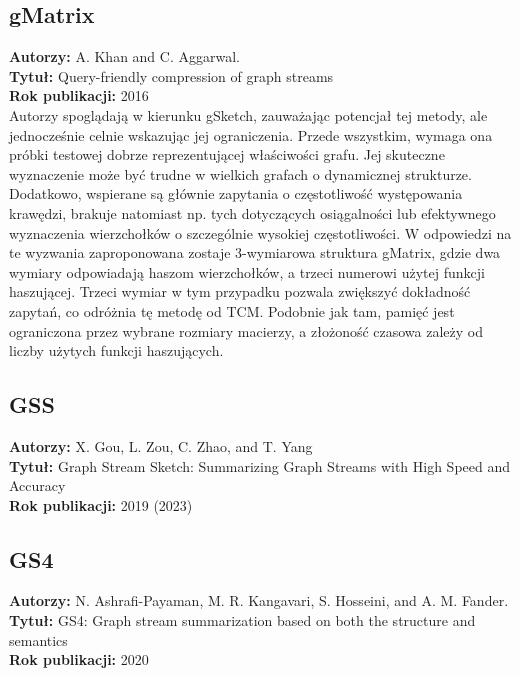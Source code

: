 \documentclass{article}
\begin{document}
        \subsection{gMatrix\cite{Khan_Aggarwal_2016}}
            \textbf{Autorzy: } A. Khan and C. Aggarwal.\\
            \textbf{Tytuł: } Query-friendly compression of graph streams\\
            \textbf{Rok publikacji: } 2016\\
            Autorzy spoglądają w kierunku gSketch, zauważając potencjał tej metody, ale jednocześnie celnie wskazując jej ograniczenia. Przede wszystkim, wymaga ona próbki testowej dobrze reprezentującej właściwości grafu. Jej skuteczne wyznaczenie może być trudne w wielkich grafach o dynamicznej strukturze. Dodatkowo, wspierane są głównie zapytania o częstotliwość występowania krawędzi, brakuje natomiast np. tych dotyczących osiągalności lub efektywnego wyznaczenia wierzchołków o szczególnie wysokiej częstotliwości. W odpowiedzi na te wyzwania zaproponowana zostaje 3-wymiarowa struktura gMatrix, gdzie dwa wymiary odpowiadają haszom wierzchołków, a trzeci numerowi użytej funkcji haszującej. Trzeci wymiar w tym przypadku pozwala zwiększyć dokładność zapytań, co odróżnia tę metodę od TCM. Podobnie jak tam, pamięć jest ograniczona przez wybrane rozmiary macierzy, a złożoność czasowa zależy od liczby użytych funkcji haszujących.  


        \subsection{GSS\cite{Gou_Zou_Zhao_Yang_2019, Gou_Zou_Zhao_Yang_2023}}
            \textbf{Autorzy: } X. Gou, L. Zou, C. Zhao, and T. Yang\\
            \textbf{Tytuł: } Graph Stream Sketch: Summarizing Graph
            Streams with High Speed and Accuracy\\
            \textbf{Rok publikacji: } 2019 (2023)\\

        \subsection{GS4\cite{Ashrafi-Payaman_Kangavari_Hosseini_Fander_2020}}
            \textbf{Autorzy: } N. Ashrafi-Payaman, M. R. Kangavari, S. Hosseini, and A. M. Fander.\\
            \textbf{Tytuł: } GS4: Graph stream summarization
            based on both the structure and semantics\\
            \textbf{Rok publikacji: } 2020\\
\end{document}
